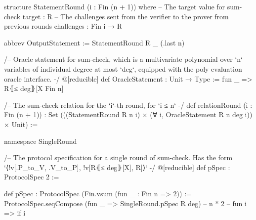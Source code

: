 \begin{leancode}
structure StatementRound (i : Fin (n + 1)) where
  -- The target value for sum-check
  target : R
  -- The challenges sent from the verifier to the prover from previous rounds
  challenges : Fin i → R

abbrev OutputStatement := StatementRound R _ (.last n)

/-- Oracle statement for sum-check, which is a multivariate polynomial over `n` variables of
  individual degree at most `deg`, equipped with the poly evaluation oracle interface. -/
@[reducible]
def OracleStatement : Unit → Type := fun _ => R⦃≤ deg⦄[X Fin n]

/-- The sum-check relation for the `i`-th round, for `i ≤ n` -/
def relationRound (i : Fin (n + 1)) :
    Set (((StatementRound R n i) × (∀ i, OracleStatement R n deg i)) × Unit) :=
\end{leancode}



\begin{leancode}
namespace SingleRound

/-- The protocol specification for a single round of sum-check.
Has the form `⟨!v[.P_to_V, .V_to_P], !v[R⦃≤ deg⦄[X], R]⟩` -/
@[reducible]
def pSpec : ProtocolSpec 2 :=
\end{leancode}



\begin{leancode}
def pSpec : ProtocolSpec (Fin.vsum (fun _ : Fin n => 2)) :=
  ProtocolSpec.seqCompose (fun _ => SingleRound.pSpec R deg)
  -- n * 2
  -- fun i => if i %

\end{leancode}



